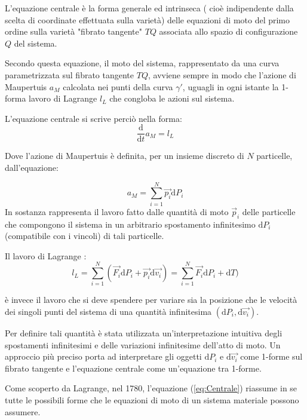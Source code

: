 \documentclass[11pt]{report}
\theoremstyle{plain}
\theoremstyle{definition}
\theoremstyle{remark}
\begin{document}
L'equazione centrale è la forma generale ed intrinseca ( cioè indipendente dalla scelta di coordinate effettuata sulla varietà) delle equazioni di moto del primo ordine sulla varietà "fibrato tangente" $TQ$ associata allo spazio di configurazione $Q$ del sistema.

Secondo questa equazione, il moto del sistema, rappresentato da una curva parametrizzata sul fibrato tangente $TQ$, avviene sempre in modo che l'azione di Maupertuis $a_{M}$ calcolata nei punti della curva $\gamma'$, uguagli in ogni istante la 1-forma lavoro di Lagrange $l_{L}$ che congloba le azioni sul sistema.

L'equazione centrale si scrive perciò nella forma:
\begin{equation}\label{eq:Centrale}
\dfrac{\textrm{d}}{\textrm{d}t}a_{M} = l_{L}
\end{equation}


Dove l'azione di Maupertuis è definita, per un insieme discreto di $N$ particelle, dall'equazione:

\begin{displaymath}
a_{M} = \sum_{i=1}^{N} \vec{p_{i}}\textrm{d}P_{i}
\end{displaymath}
In sostanza rappresenta il lavoro fatto dalle quantità di moto $\vec{p}_{i}$ delle particelle che compongono il sistema in un arbitrario spostamento infinitesimo $\textrm{d}P_{i}$ (compatibile con i vincoli) di tali particelle.

Il lavoro di Lagrange :
\begin{displaymath}
l_{L} = \sum_{i=1}^{N}( \vec{F_{i}} \textrm{d}P_{i} + \vec{p_{i}}\textrm{d}\vec{v_{i}}) = \sum_{i=1}^{N} \vec{F_{i}} \textrm{d}P_{i} + \textrm{d}T)
\end{displaymath}

è invece il lavoro che si deve spendere per variare sia la posizione che le velocità dei singoli punti del sistema di una quantità infinitesima $(\textrm{d}P_{i}, \textrm{d} \vec{v_{i}}) $.

Per definire tali quantità è stata utilizzata un'interpretazione intuitiva degli spostamenti infinitesimi e delle variazioni infinitesime dell'atto di moto. Un approccio più preciso porta ad interpretare gli oggetti $\textrm{d}P_{i}$ e $ \textrm{d} \vec{v_{i}}$ come 1-forme sul fibrato tangente e l'equazione centrale come un'equazione tra 1-forme.


Come scoperto da Lagrange, nel 1780, l'equazione (\ref{eq:Centrale}) riassume in se tutte le possibili forme che le equazioni di moto di un sistema materiale possono assumere.
\end{document}
